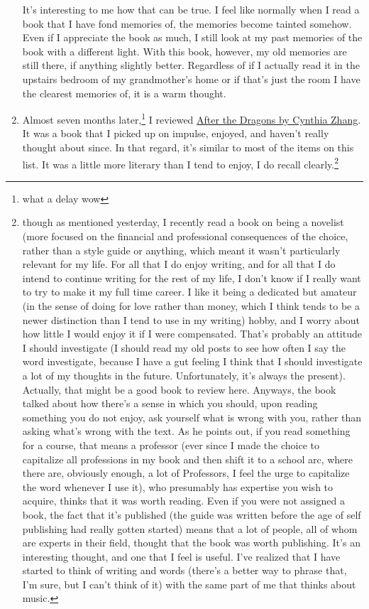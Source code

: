 \documentclass[12pt]{article}[titlepage]
\newcommand{\1}{\={a}}
\newcommand{\2}{\={e}}
\newcommand{\3}{\={\i}}
\newcommand{\4}{\=o}
\newcommand{\5}{\=u}
\newcommand{\6}{\={A}}
\renewcommand{\,}{\textsuperscript{,}}
\begin{document}
\begin{enumerate}
It's interesting to me how that can be true.
I feel like normally when I read a book that I have fond memories of, the memories become tainted somehow.
Even if I appreciate the book as much, I still look at my past memories of the book with a different light.
With this book, however, my old memories are still there, if anything slightly better.
Regardless of if I actually read it in the upstairs bedroom of my grandmother's home or if that's just the room I have the clearest memories of, it is a warm thought.
\item Almost seven months later,\footnote{what a delay wow} I reviewed \href{book-review-after-dragons.html}{After the Dragons by Cynthia Zhang}.
It was a book that I picked up on impulse, enjoyed, and haven't really thought about since.
In that regard, it's similar to most of the items on this list.
It was a little more literary than I tend to enjoy, I do recall clearly.\footnote{though as mentioned yesterday, I recently read a book on being a novelist (more focused on the financial and professional consequences of the choice, rather than a style guide or anything, which meant it wasn't particularly relevant for my life.
For all that I do enjoy writing, and for all that I do intend to continue writing for the rest of my life, I don't know if I really want to try to make it my full time career.
I like it being a dedicated but amateur (in the sense of doing for love rather than money, which I think tends to be a newer distinction than I tend to use in my writing) hobby, and I worry about how little I would enjoy it if I were compensated.
That's probably an attitude I should investigate (I should read my old posts to see how often I say the word investigate, because I have a gut feeling I think that I should investigate a lot of my thoughts in the future.
Unfortunately, it's always the present).
Actually, that might be a good book to review here.
Anyways, the book talked about how there's a sense in which you should, upon reading something you do not enjoy, ask yourself what is wrong with you, rather than asking what's wrong with the text.
As he points out, if you read something for a course, that means a professor (ever since I made the choice to capitalize all professions in my book and then shift it to a school arc, where there are, obviously enough, a lot of Professors, I feel the urge to capitalize the word whenever I use it), who presumably has expertise you wish to acquire, thinks that it was worth reading.
Even if you were not assigned a book, the fact that it's published (the guide was written before the age of self publishing had really gotten started) means that a lot of people, all of whom are experts in their field, thought that the book was worth publishing.
It's an interesting thought, and one that I feel is useful.
I've realized that I have started to think of writing and words (there's a better way to phrase that, I'm sure, but I can't think of it) with the same part of me that thinks about music.

}
\end{enumerate}
\end{document}
